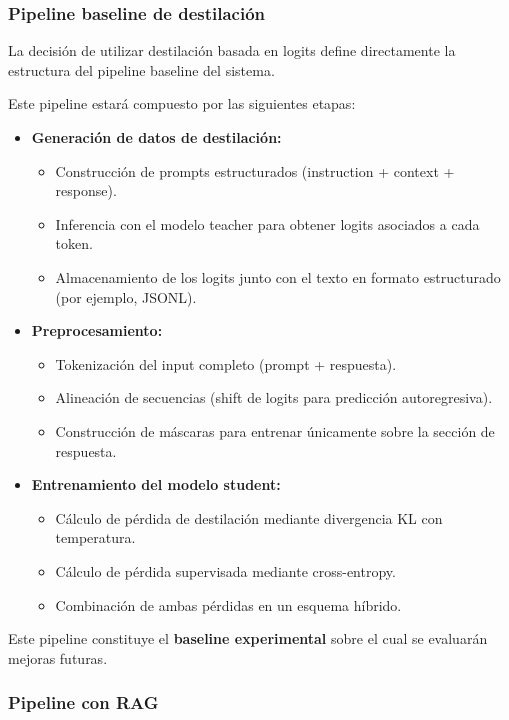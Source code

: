 \documentclass[12pt]{article}
\begin{document}
	\subsubsection{Pipeline baseline de destilación}
	
	La decisión de utilizar destilación basada en logits define directamente la estructura del pipeline baseline del sistema.
	
	Este pipeline estará compuesto por las siguientes etapas:
	
	\begin{itemize}
		\item \textbf{Generación de datos de destilación:}
		\begin{itemize}
			\item Construcción de prompts estructurados (instruction + context + response).
			\item Inferencia con el modelo teacher para obtener logits asociados a cada token.
			\item Almacenamiento de los logits junto con el texto en formato estructurado (por ejemplo, JSONL).
		\end{itemize}
		
		\item \textbf{Preprocesamiento:}
		\begin{itemize}
			\item Tokenización del input completo (prompt + respuesta).
			\item Alineación de secuencias (shift de logits para predicción autoregresiva).
			\item Construcción de máscaras para entrenar únicamente sobre la sección de respuesta.
		\end{itemize}
		
		\item \textbf{Entrenamiento del modelo student:}
		\begin{itemize}
			\item Cálculo de pérdida de destilación mediante divergencia KL con temperatura.
			\item Cálculo de pérdida supervisada mediante cross-entropy.
			\item Combinación de ambas pérdidas en un esquema híbrido.
		\end{itemize}
	\end{itemize}
	
	Este pipeline constituye el \textbf{baseline experimental} sobre el cual se evaluarán mejoras futuras.
	
	\subsubsection{Pipeline con RAG}
	
\end{document}
